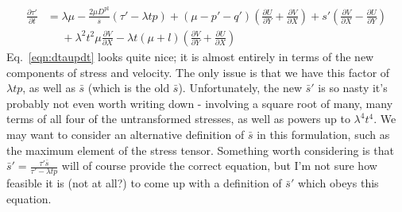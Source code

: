 \documentclass[11pt]{article}
\newcommand{\p}{\partial}
\newcommand{\Dpl}{D^\text{pl}}
\begin{document}
\begin{align}
    \frac{\p \tau'}{\p t} &= \lambda\mu - \frac{2\mu\Dpl}{\bar{s}}(\tau' - \lambda t p) + (\mu - p' - q') \left( \frac{\p U}{\p Y} + \frac{\p V}{\p X}\right) + s' \left(\frac{\p V}{\p X} - \frac{\p U}{\p Y}\right) \\
    &\phantom{=} + \lambda^2 t^2\mu \frac{\p V}{\p X} - \lambda t (\mu + l)\left(\frac{\p V}{\p Y} + \frac{\p U}{\p X}\right)
    \label{eqn:dtaupdt}
\end{align}
Eq.~\ref{eqn:dtaupdt} looks quite nice; it is almost entirely in terms of the new components of stress and velocity. The only issue is that we have this factor of $\lambda t p$, as well as $\bar{s}$ (which is the old $\bar{s}$). Unfortunately, the new $\bar{s}'$ is so nasty it's probably not even worth writing down - involving a square root of many, many terms of all four of the untransformed stresses, as well as powers up to $\lambda^4 t^4$. We may want to consider an alternative definition of $\bar{s}$ in this formulation, such as the maximum element of the stress tensor. Something worth considering is that $\bar{s}' = \frac{\tau' \bar{s}}{\tau' - \lambda t p}$ will of course provide the correct equation, but I'm not sure how feasible it is (not at all?) to come up with a definition of $\bar{s}'$ which obeys this equation.
\end{document}
